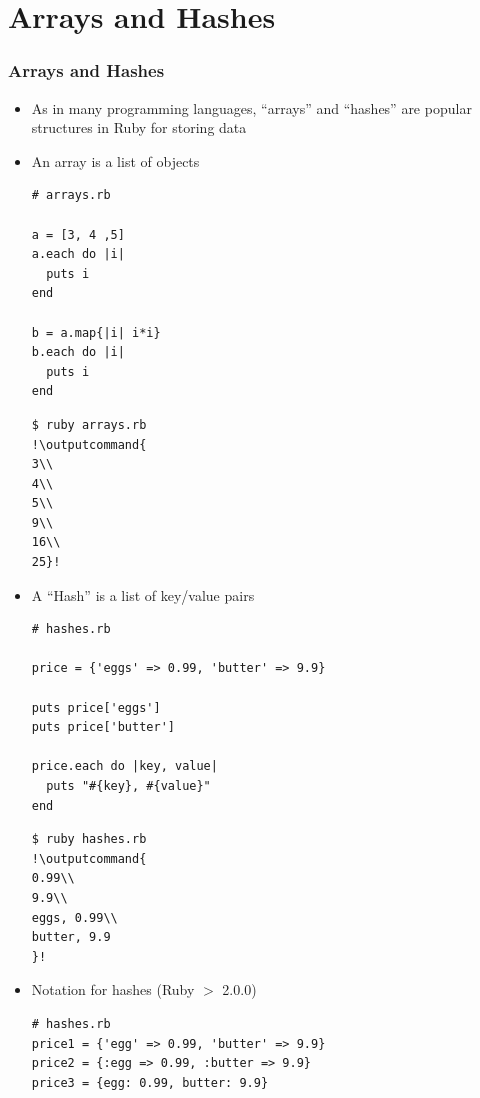 \documentclass{beamer}
\newcommand{\outputcommand}[1]{\color{darkgreen}{#1}}
\begin{document}
\section{Arrays and Hashes}
\begin{frame}
\frametitle{Arrays and Hashes}
\begin{itemize}
 \item As in many programming languages, ``arrays'' and ``hashes'' are popular structures in Ruby for storing data
 \item An array is a list of objects 
\lstset{language=Ruby, style=eclipse}
\begin{lstlisting}[escapechar=&]
# arrays.rb

a = [3, 4 ,5]
a.each do |i|
  puts i
end

b = a.map{|i| i*i}
b.each do |i|
  puts i
end
\end{lstlisting}

\lstset{language=shell}
\begin{lstlisting}[numbers=none, escapechar=!]
$ ruby arrays.rb
!\outputcommand{
3\\
4\\
5\\
9\\
16\\
25}!
\end{lstlisting}
 \item A ``Hash'' is a list of key/value pairs
\lstset{language=Ruby, style=eclipse}
\begin{lstlisting}[escapechar=&]
# hashes.rb

price = {'eggs' => 0.99, 'butter' => 9.9}

puts price['eggs']
puts price['butter']

price.each do |key, value|
  puts "#{key}, #{value}"
end
\end{lstlisting}

\lstset{language=shell}
\begin{lstlisting}[numbers=none, escapechar=!]
$ ruby hashes.rb
!\outputcommand{
0.99\\
9.9\\
eggs, 0.99\\
butter, 9.9
}!
\end{lstlisting}

\item Notation for hashes (Ruby $>$ 2.0.0)
\lstset{language=Ruby, style=eclipse}
\begin{lstlisting}[escapechar=&]
# hashes.rb
price1 = {'egg' => 0.99, 'butter' => 9.9}
price2 = {:egg => 0.99, :butter => 9.9}
price3 = {egg: 0.99, butter: 9.9}


\end{lstlisting}
\end{itemize}
\end{frame}
\end{document}
